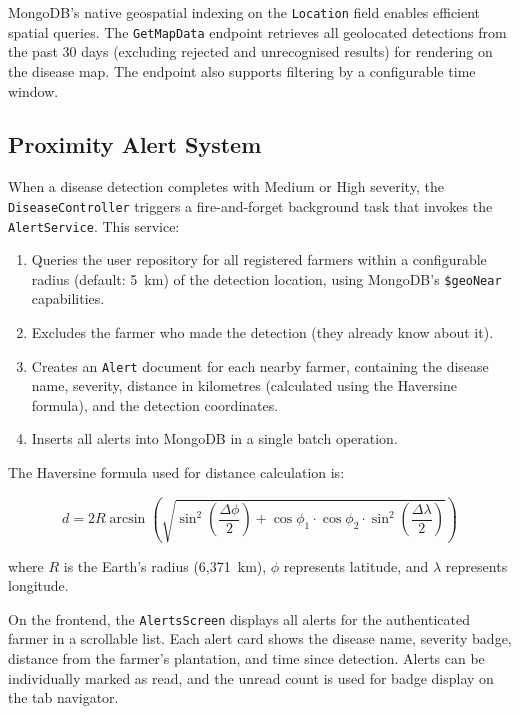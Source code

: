 MongoDB's native geospatial indexing on the \texttt{Location} field enables efficient spatial queries. The \texttt{GetMapData} endpoint retrieves all geolocated detections from the past 30 days (excluding rejected and unrecognised results) for rendering on the disease map. The endpoint also supports filtering by a configurable time window.


\subsection{Proximity Alert System}

When a disease detection completes with Medium or High severity, the \texttt{DiseaseController} triggers a fire-and-forget background task that invokes the \texttt{AlertService}. This service:

\begin{enumerate}
    \item Queries the user repository for all registered farmers within a configurable radius (default: 5~km) of the detection location, using MongoDB's \texttt{\$geoNear} capabilities.
    \item Excludes the farmer who made the detection (they already know about it).
    \item Creates an \texttt{Alert} document for each nearby farmer, containing the disease name, severity, distance in kilometres (calculated using the Haversine formula), and the detection coordinates.
    \item Inserts all alerts into MongoDB in a single batch operation.
\end{enumerate}

The Haversine formula used for distance calculation is:

\begin{equation}
    d = 2R \arcsin\left(\sqrt{\sin^2\left(\frac{\Delta\phi}{2}\right) + \cos\phi_1 \cdot \cos\phi_2 \cdot \sin^2\left(\frac{\Delta\lambda}{2}\right)}\right)
    \label{eq:haversine}
\end{equation}

\noindent where $R$ is the Earth's radius (6,371~km), $\phi$ represents latitude, and $\lambda$ represents longitude.

On the frontend, the \texttt{AlertsScreen} displays all alerts for the authenticated farmer in a scrollable list. Each alert card shows the disease name, severity badge, distance from the farmer's plantation, and time since detection. Alerts can be individually marked as read, and the unread count is used for badge display on the tab navigator.



